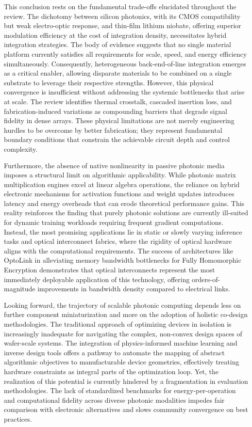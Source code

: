 \documentclass[11pt]{article}
\begin{document}
This conclusion rests on the fundamental trade-offs elucidated throughout the review. The dichotomy between silicon photonics, with its CMOS compatibility but weak electro-optic response, and thin-film lithium niobate, offering superior modulation efficiency at the cost of integration density, necessitates hybrid integration strategies. The body of evidence suggests that no single material platform currently satisfies all requirements for scale, speed, and energy efficiency simultaneously. Consequently, heterogeneous back-end-of-line integration emerges as a critical enabler, allowing disparate materials to be combined on a single substrate to leverage their respective strengths. However, this physical convergence is insufficient without addressing the systemic bottlenecks that arise at scale. The review identifies thermal crosstalk, cascaded insertion loss, and fabrication-induced variations as compounding barriers that degrade signal fidelity in dense arrays. These physical limitations are not merely engineering hurdles to be overcome by better fabrication; they represent fundamental boundary conditions that constrain the achievable circuit depth and control complexity.

Furthermore, the absence of native nonlinearity in passive photonic media imposes a structural limit on algorithmic applicability. While photonic matrix multiplication engines excel at linear algebra operations, the reliance on hybrid electronic mechanisms for activation functions and weight updates introduces latency and energy overheads that can erode theoretical performance gains. This reality reinforces the finding that purely photonic solutions are currently ill-suited for dynamic training workloads requiring frequent gradient computations. Instead, the most promising applications lie in static or slowly varying inference tasks and optical interconnect fabrics, where the rigidity of optical hardware aligns with the computational requirements. The success of architectures like OptoLink in alleviating memory bandwidth bottlenecks for Fully Homomorphic Encryption demonstrates that optical interconnects represent the most immediately deployable application of this technology, offering orders-of-magnitude improvements in bandwidth density compared to electrical links.

Looking forward, the trajectory of scalable photonic computing depends less on further component miniaturization and more on the adoption of holistic co-design methodologies. The traditional approach of optimizing devices in isolation is increasingly inadequate for navigating the complex, non-convex design spaces of wafer-scale systems. The integration of physics-informed machine learning and inverse design tools offers a pathway to automate the mapping of abstract algorithmic objectives to manufacturable device geometries, effectively treating hardware constraints as integral parts of the optimization loop. Yet, the realization of this potential is currently hindered by a fragmentation in evaluation methodologies. The lack of standardized benchmarks for energy-per-operation and computational fidelity across diverse photonic modalities impedes fair comparison with electronic alternatives and slows community convergence on best practices.
\end{document}
